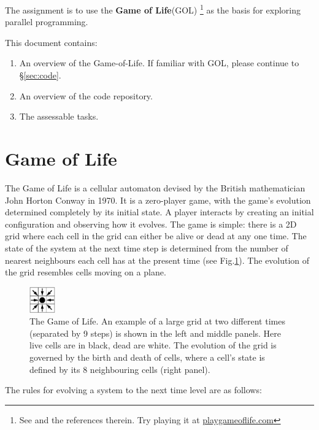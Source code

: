 The assignment is to use the \textbf{Game of Life}(GOL) \footnote{See \cite{gol-wiki} and the references therein. Try playing it at \href{https://playgameoflife.com/}{playgameoflife.com}} as the basis for exploring parallel programming. 

This document contains:
\begin{enumerate}
	\item[\S\ref{sec:gol}:] An overview of the Game-of-Life. If familiar with GOL, please continue to \S\ref{sec:code}.
	\item[\S\ref{sec:code}:] An overview of the code repository. 
	\item[\S\ref{sec:tasks}:] The assessable tasks.
\end{enumerate}

\section{Game of Life}\label{sec:gol}
The Game of Life is a cellular automaton devised by the British mathematician John Horton Conway in 1970\cite{gol}. It is a zero-player game, with the game's evolution determined completely by its initial state. A player interacts by creating an initial configuration and observing how it evolves. The game is simple: there is a 2D grid where each cell in the grid can either be alive or dead at any one time. The state of the system at the next time step is determined from the number of nearest neighbours each cell has at the present time (see Fig.\ref{fig:gol}). The evolution of the grid resembles cells moving on a plane. 
\begin{figure}[!h]	
	\centering
	\includegraphics[width=0.1\textwidth, valign=B]{figs/neighbour}
	\caption{The Game of Life. An example of a large grid at two different times (separated by 9 steps) is shown in the left and middle panels. Here live cells are in black, dead are white. The evolution of the grid is governed by the birth and death of cells, where a cell's state is defined by its 8 neighbouring cells (right panel).}
	\label{fig:gol}
\end{figure}
\par 
The rules for evolving a system to the next time level are as follows:
